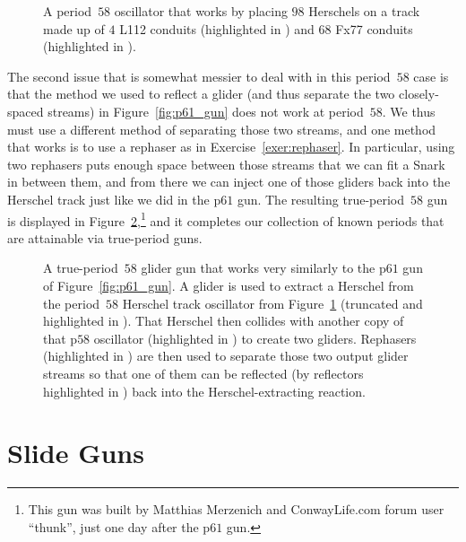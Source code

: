 \begin{figure}[!htb]
	\centering
	\caption{A period~$58$ oscillator that works by placing $98$ Herschels on a track made up of $4$ L112 conduits (highlighted in ) and $68$ Fx77 conduits (highlighted in ).}\label{fig:p58_herschel_track}
\end{figure}

The second issue that is somewhat messier to deal with in this period~$58$ case is that the method we used to reflect a glider (and thus separate the two closely-spaced streams) in Figure~\ref{fig:p61_gun} does not work at period~$58$. We thus must use a different method of separating those two streams, and one method that works is to use a rephaser as in Exercise~\ref{exer:rephaser}. In particular, using two rephasers puts enough space between those streams that we can fit a Snark in between them, and from there we can inject one of those gliders back into the Herschel track just like we did in the p$61$ gun. The resulting true-period~$58$ gun is displayed in Figure~\ref{fig:p58_gun},\footnote{This gun was built by Matthias Merzenich and ConwayLife.com forum user ``thunk'', just one day after the p$61$ gun.} and it completes our collection of known periods that are attainable via true-period guns.

\begin{figure}[!htb]
	\centering
	\caption{A true-period~$58$ glider gun that works very similarly to the p$61$ gun of Figure~\ref{fig:p61_gun}. A glider is used to extract a Herschel from the period~$58$ Herschel track oscillator from Figure~\ref{fig:p58_herschel_track} (truncated and highlighted in ). That Herschel then collides with another copy of that p$58$ oscillator (highlighted in ) to create two gliders. Rephasers (highlighted in ) are then used to separate those two output glider streams so that one of them can be reflected (by reflectors highlighted in ) back into the Herschel-extracting reaction.}\label{fig:p58_gun}
\end{figure}



\section{Slide Guns}\label{sec:slide_guns}

